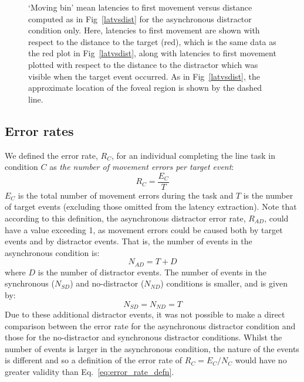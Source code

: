\documentclass[10pt,letterpaper]{article}
\begin{document}
\begin{figure}[htb!]
\centering
\caption[Mean latencies vs. distance] {`Moving bin' mean latencies to
  first movement versus distance computed as in Fig~\ref{latvsdist}
  for the asynchronous distractor condition only. Here, latencies to
  first movement are shown with respect to the distance to the target
  (red), which is the same data as the red plot in
  Fig~\ref{latvsdist}, along with latencies to first movement plotted
  with respect to the distance to the distractor which was visible
  when the target event occurred. As in Fig~\ref{latvsdist}, the
  approximate location of the foveal region is shown by the dashed
  line.}
\label{latvslastdist}
\end{figure}


\subsection*{Error rates}

We defined the error rate, $R_{C}$, for an individual completing
the line task in condition $C$ as \emph{the number of movement errors
  per target event}:
%
\begin{equation}\label{eq:error_rate_defn}
R_{C} = \frac{E_{C}}{T}
\end{equation}
%
$E_{C}$ is the total number of movement errors during the task
and $T$ is the number of target events (excluding those
omitted from the latency extraction).
%
Note that according to this definition, the asynchronous distractor
error rate, $R_{AD}$, could have a value exceeding 1, as movement
errors could be caused both by target events and by distractor
events. That is, the number of events in the asynchronous condition is:
%
\begin{equation}\label{eq:num_events_async}
N_{AD} = T + D
\end{equation}
%
where $D$ is the number of distractor events. The number of events in
the synchronous ($N_{SD}$) and no-distractor ($N_{ND}$) conditions is
smaller, and is given by:
%
\begin{equation}\label{eq:num_events_sync}
N_{SD} = N_{ND} = T
\end{equation}
%
Due to these additional distractor events, it was not possible to make
a direct comparison between the error rate for the asynchronous
distractor condition and those for the no-distractor and synchronous
distractor conditions. Whilst the number of events is larger in the
asynchronous condition, the nature of the events is different and so a
definition of the error rate of $R_{C} = {E_C}/{N_C}$ would have
no greater validity than Eq.~\ref{eq:error_rate_defn}.
\end{document}
